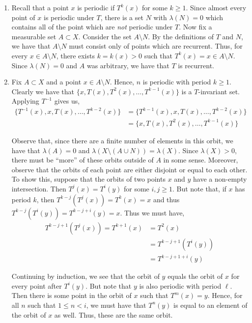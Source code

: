 \documentclass[12pt]{article}
\begin{document}
\begin{enumerate}[label=\alph*)]

\item Recall that a point $x$ is periodic if $T^k(x)$ for some $k \geq 1$. Since almost every point of $x$ is periodic under $T$, there is a set $N$ with $\lambda(N) = 0$ which contains all of the point which are \textit{not} periodic under $T$. Now fix a measurable set $A \subset X$. Consider the set $A \setminus N$. By the definitions of $T$ and $N$, we have that $A \setminus N$ must consist only of points which are recurrent. Thus, for every $x \in A \setminus N$, there exists $k = k(x) > 0$ such that $T^k(x) = x \in A \setminus N$. Since $\lambda(N) = 0$ and $A$ was arbitrary, we have that $T$ is recurrent.

\item Fix $A \subset X$ and a point $x \in A \setminus N$. Hence, $n$ is periodic with period $k \geq 1$. Clearly we have that $\{x, T(x), T^2(x), \ldots, T^{k-1}(x)\}$ is a $T$-invariant set. Applying $T^{-1}$ gives us,
\begin{align*}
\{T^{-1}(x), x, T(x), \ldots, T^{k-2}(x)\} &= \{T^{k-1}(x), x, T(x), \ldots, T^{k-2}(x)\}\\
&= \{x, T(x), T^2(x), \ldots, T^{k-1}(x)\}
\end{align*} 

Observe that, since there are a finite number of elements in this orbit, we have that $\lambda(A) = 0$ and $\lambda(X \setminus (A \cup N)) = \lambda(X)$. Since $\lambda(X) > 0$, there must be ``more'' of these orbits outside of $A$ in some sense. Moreover, observe that the orbits of each point are either disjoint or equal to each other. To show this, suppose that the orbits of two points $x$ and $y$ have a non-empty intersection. Then $T^j(x) = T^i(y)$ for some $i,j \geq 1$. But note that, if $x$ has period $k$, then $T^{k-j}(T^j(x)) = T^k(x) = x$ and thus $T^{k-j}(T^i(y)) = T^{k-j+i}(y)  = x$. Thus we must have,
\begin{align*}
T^{k-j+1}(T^j(x)) = T^{k+1}(x) &= T^2(x)\\
&= T^{k-j+1}(T^i(y))\\
&= T^{k-j+1+i}(y)
\end{align*}

Continuing by induction, we see that the orbit of $y$ equals the orbit of $x$ for every point after $T^i(y)$. But note that $y$ is also periodic with period $\ell$. Then there is some point in the orbit of $x$ such that $T^m(x) = y$. Hence, for all $n$ such that $1 \leq n < i$, we must have that $T^n(y)$ is equal to an element of the orbit of $x$ as well. Thus, these are the same orbit.\\


\end{enumerate}
\end{document}
